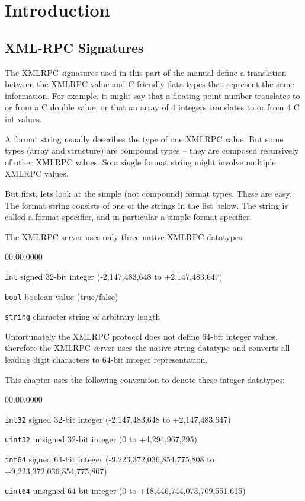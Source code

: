 \chapter{Introduction}


\section{XML-RPC Signatures}

The XMLRPC signatures used in this part of the manual define a translation
between the XMLRPC value and C-friendly data types that represent the same
information. For example, it might say that a floating point number translates
to or from a C double value, or that an array of 4 integers translates to or
from 4 C int values.

A format string usually describes the type of one XMLRPC value. But some types
(array and structure) are compound types -- they are composed recursively of
other XMLRPC values. So a single format string might involve multiple XMLRPC
values.

But first, lets look at the simple (not compound) format types. These are easy.
The format string consists of one of the strings in the list below. The string
is called a format specifier, and in particular a simple format specifier.

The XMLRPC server uses only three native XMLRPC datatypes:

\begin{labeling}{00.00.0000}
\item [{\texttt{int}}] signed 32-bit integer (-2,147,483,648 to +2,147,483,647)
\item [{\texttt{bool}}] boolean value (true/false)
\item [{\texttt{string}}] character string of arbitrary length
\end{labeling}

Unfortunately the XMLRPC protocol does not define 64-bit integer values,
therefore the XMLRPC server uses the native string datatype and converts all
leading digit characters to 64-bit integer representation.

This chapter uses the following convention to denote these integer datatypes:

\begin{labeling}{00.00.0000}
\item [{\texttt{int32}}] signed 32-bit integer
	(-2,147,483,648 to +2,147,483,647)
\item [{\texttt{uint32}}] unsigned 32-bit integer
	(0 to +4,294,967,295)
\item [{\texttt{int64}}] signed 64-bit integer
	(-9,223,372,036,854,775,808 to +9,223,372,036,854,775,807)
\item [{\texttt{uint64}}] unsigned 64-bit integer
	(0 to +18,446,744,073,709,551,615)
\end{labeling}

